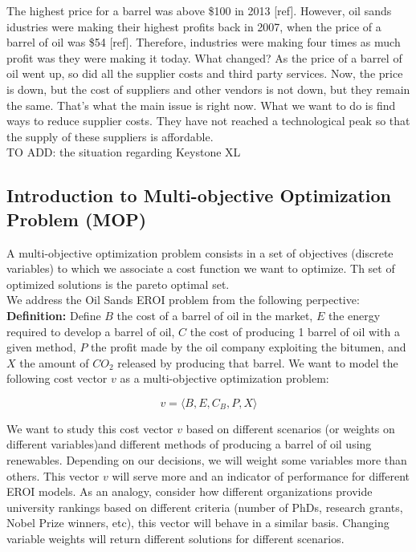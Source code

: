 \documentclass[12pt]{article}
\begin{document}
The highest price for a barrel was above \$100 in 2013 [ref]. However, oil sands idustries were making their highest profits back in 2007, when the price of a barrel of oil was \$54 [ref]. Therefore, industries were making four times as much profit was they were making it today. What changed? As the price of a barrel of oil went up, so did all the supplier costs and third party services. Now, the price is down, but the cost of suppliers and other vendors is not down, but they remain the same. That's what the main issue is right now. What we want to do is find ways to reduce supplier costs. They have not reached a technological peak so that the supply of these suppliers is affordable.\\

TO ADD: the situation regarding Keystone XL

\subsection{Introduction to Multi-objective Optimization Problem (MOP)}

A multi-objective optimization problem consists in a set of objectives (discrete variables) to which we associate a cost function we want to optimize. Th set of optimized solutions is the pareto optimal set. \\

We address the Oil Sands EROI problem from the following perpective: \\

{\bf Definition:} Define $B$ the cost of a barrel of oil in the market, $E$ the energy required to develop a barrel of oil, $C$ the cost of producing 1 barrel of oil with a given method, $P$ the profit made by the oil company exploiting the bitumen, and $X$ the amount of $CO_2$ released by producing that barrel. We want to model the following cost vector $v$ as a multi-objective optimization problem:

\begin{displaymath}
v = \langle B, E, C_B, P, X \rangle
\end{displaymath}

We want to study this cost vector $v$ based on different scenarios (or weights on different variables)and different methods of producing a barrel of oil using renewables. Depending on our decisions, we will weight some variables more than others. This vector $v$ will serve more and an indicator of performance for different EROI models. As an analogy, consider how different organizations provide university rankings based on different criteria (number of PhDs, research grants, Nobel Prize winners, etc), this vector will behave in a similar basis.  Changing variable weights will return different solutions for different scenarios. \\
\end{document}
